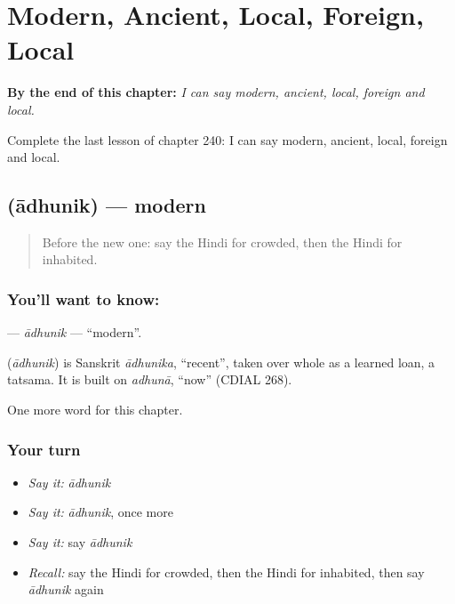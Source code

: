 
\chapter{Modern, Ancient, Local, Foreign, Local}
\label{ch:hi-modern-ancient-local-foreign-local}

\begin{chapteropening}
\textbf{By the end of this chapter:} \emph{I can say modern, ancient, local, foreign and local.}

Complete the last lesson of chapter 240: I can say modern, ancient, local, foreign and local.
\end{chapteropening}

\section[\texorpdfstring{\hi{आधुनिक} (ādhunik)}{आधुनिक (ādhunik)}]{ (ādhunik) — modern}

\label{lesson:HI-C240-adhunik}



\begin{quote}
Before the new one: say the Hindi for crowded, then the Hindi for inhabited.
\end{quote}

\subsection*{You'll want to know: }
\textbf{} — \emph{ādhunik} — \textquotedblleft{}modern\textquotedblright{}.

\begin{cousinweb}
\textbf{} (\emph{ādhunik}) is Sanskrit \emph{ādhunika}, \textquotedblleft{}recent\textquotedblright{}, taken over whole as a learned loan, a tatsama. It is built on \emph{adhunā}, \textquotedblleft{}now\textquotedblright{} (CDIAL 268).
\end{cousinweb}

\begin{grammarlens}[title={What you've built}]
One more word for this chapter.
\end{grammarlens}

\subsection*{Your turn}
\begin{itemize}
\raggedright
  \item \emph{Say it:} \emph{ādhunik}
  \item \emph{Say it:} \emph{ādhunik}, once more
  \item \emph{Say it:} say \emph{ādhunik}
  \item \emph{Recall:} say the Hindi for crowded, then the Hindi for inhabited, then say \emph{ādhunik} again
\end{itemize}

